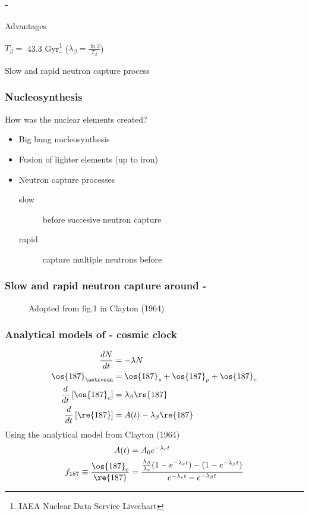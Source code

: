 \begin{frame}
  \frametitle{-}
  \centering
  Advantages
  \begin{description}[labelwidth=\widthof{Different sources}] %
  \item[Halflife] $T_\beta =$ 43.3 Gyr\footnote{IAEA Nuclear Data Service Livechart} ($\lambda_\beta=\frac{\ln 2}{T_\beta}$)
  \item[Different sources] Slow and rapid neutron capture process 
  \end{description} %
\end{frame}

\begin{frame}
  \frametitle{Nucleosynthesis}
  How was the nuclear elements created?
  \begin{itemize}
  \item Big bang nucleosynthesis
  \item Fusion of lighter elements (up to iron)
  \item Neutron capture processes
    \begin{description}
    \item[slow] \betadecays before succesive neutron capture
    \item[rapid] capture multiple neutrons before \betadecay
    \end{description}
  \end{itemize}
\end{frame}

\begin{frame}
  \frametitle{Slow and rapid neutron capture around -}
  \begin{figure}
    
    \caption{Adopted from fig.1 in Clayton (1964)}
  \end{figure}
\end{frame}

\begin{frame}
  \frametitle{Analytical models of - cosmic clock}
  \begin{align*}
    \frac{dN}{dt} &= -\lambda N \\
    \os{187}_{\astrosun} &= \os{187}_{s} + \os{187}_{p} + \os{187}_{c} \\
    \frac{d}{dt}\left[\os{187}_{c}\right] &= \lambda_\beta \re{187} \\
    \frac{d}{dt}\left[\re{187}\right] &= A(t) - \lambda_\beta \re{187} 
  \end{align*}
  Using the analytical model from Clayton (1964)
  \begin{align*}
    A(t) &= A_0e^{-\lambda_{r}t} \\
    f_{187} \equiv \frac{\os{187}_c}{\re{187}} &= \frac{\frac{\lambda_\beta}{\lambda_r} (1-e^{-\lambda_r t}) - (1-e^{-\lambda_\beta t})}{e^{-\lambda_{r}t}-e^{-\lambda_\beta t}}
  \end{align*}
\end{frame}

